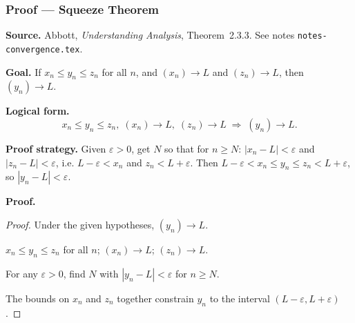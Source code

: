 
\clearpage
{}
\hypertarget{proof-RA-ABB-P-squeeze}{}

\subsubsection[Squeeze Theorem]{Proof --- Squeeze Theorem}

\bigskip

\noindent
\textbf{Source.}
Abbott, \emph{Understanding Analysis}, Theorem~2.3.3.
See notes \texttt{notes-convergence.tex}.

\vspace{0.75em}

\noindent
\textbf{Goal.}
If $x_n \le y_n \le z_n$ for all $n$, and $(x_n) \to L$ and $(z_n) \to L$,
then $(y_n) \to L$.

\vspace{0.75em}

\noindent
\textbf{Logical form.}
\[
  x_n \le y_n \le z_n,\;
  (x_n) \to L,\;
  (z_n) \to L
  \;\Rightarrow\; (y_n) \to L.
\]

\vspace{0.75em}

\noindent
\textbf{Proof strategy.}
Given $\varepsilon > 0$, get $N$ so that for $n \ge N$:
$|x_n - L| < \varepsilon$ and $|z_n - L| < \varepsilon$, i.e.
$L - \varepsilon < x_n$ and $z_n < L + \varepsilon$.
Then $L - \varepsilon < x_n \le y_n \le z_n < L + \varepsilon$, so
$|y_n - L| < \varepsilon$.

\vspace{0.75em}

\noindent
\textbf{Proof.}
\begin{proof}
\Claim Under the given hypotheses, $(y_n) \to L$.

\Given $x_n \le y_n \le z_n$ for all $n$; $(x_n) \to L$; $(z_n) \to L$.

\Goal For any $\varepsilon > 0$, find $N$ with $|y_n - L| < \varepsilon$ for $n \ge N$.

\Strategy The bounds on $x_n$ and $z_n$ together constrain $y_n$ to the
interval $(L - \varepsilon, L + \varepsilon)$.

\medskip






\end{proof}

